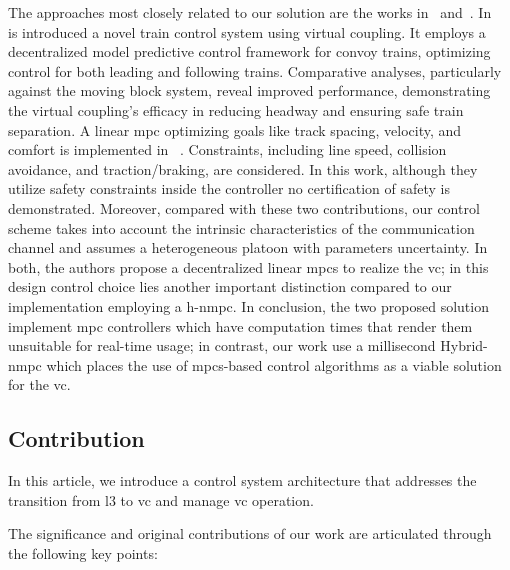 The approaches most closely related to our solution are the works in~\cite{felez2019model} and~\cite{wu2021virtually}. In~\cite{felez2019model} is introduced a novel train control system using virtual coupling. It employs a decentralized model predictive control framework for convoy trains, optimizing control for both leading and following trains. Comparative analyses, particularly against the moving block system, reveal improved performance, demonstrating the virtual coupling's efficacy in reducing headway and ensuring safe train separation. A linear \gls{mpc} optimizing goals like track spacing, velocity, and comfort is implemented in ~\cite{wu2021virtually}. Constraints, including line speed, collision avoidance, and traction/braking, are considered. In this work, although they utilize safety constraints inside the controller no certification of safety is demonstrated. Moreover, compared with these two contributions, our control scheme takes into account the intrinsic characteristics of the communication channel and assumes a heterogeneous platoon with parameters uncertainty. In both, the authors propose a decentralized linear \glspl{mpc} to realize the \gls{vc}; in this design control choice  lies another important distinction compared to our implementation employing a \gls{h-nmpc}. In conclusion, the two proposed solution implement \gls{mpc} controllers which have computation times that render them unsuitable for real-time usage; in contrast, our work use a millisecond Hybrid-\gls{nmpc} which places the use of \glspl{mpc}-based control algorithms as a viable solution for the \gls{vc}.
%
\subsection{Contribution}
\label{subsec:contribution}
%

In this article, we introduce a control system architecture that addresses the transition from \gls{l3} to \gls{vc} and manage \gls{vc} operation. 

The significance and original contributions of our work are articulated through the following key points:

